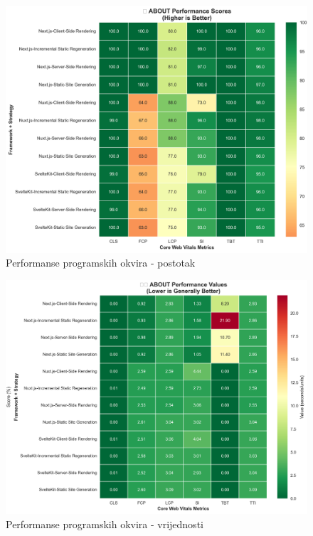 \begin{figure}[H]
    \centering
    \includegraphics[width=\textwidth]{slike/rezultati/about/about_performance_scores.png}
    \caption{Performanse programskih okvira - postotak}
    \label{fig:testiranje-o-nama-postotak}
\end{figure}

\begin{figure}[H]
    \centering
    \includegraphics[width=\textwidth]{slike/rezultati/about/about_performance_values.png}
    \caption{Performanse programskih okvira - vrijednosti}
    \label{fig:testiranje-o-nama-vrijednosti}
\end{figure}

